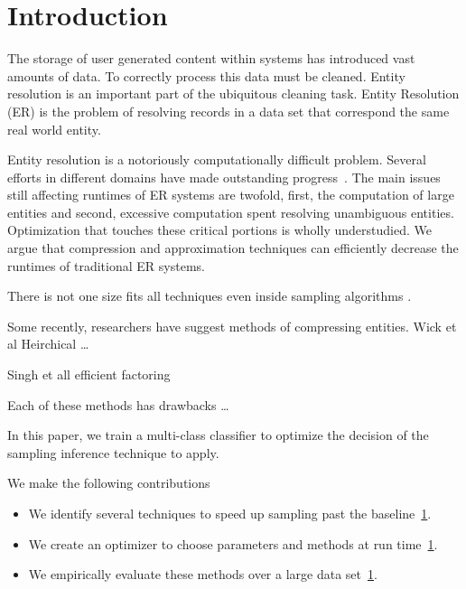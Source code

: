
\section{Introduction}

The storage of user generated content within systems has introduced 
vast amounts of data.
To correctly process this data must be cleaned. 
Entity resolution is an important part of the ubiquitous cleaning task.
Entity Resolution (ER) is the problem of resolving records in
a data set that correspond the same real world entity.

Entity resolution is a notoriously computationally difficult problem.
Several efforts in different domains have made outstanding progress~\cite{}.
The main issues still affecting runtimes of ER systems are
twofold, first, the computation of large entities and second, excessive
computation spent resolving unambiguous entities.
Optimization that touches these critical portions is wholly understudied.
We argue that compression and approximation 
techniques can efficiently decrease the runtimes of traditional ER systems.

There is not one size fits all techniques even inside sampling algorithms \cite{sculley2006compression}.

Some recently, researchers have suggest methods of compressing entities.
Wick et al Heirchical \ldots

Singh et all efficient factoring %

Each of these methods has drawbacks \ldots

In this paper, we train a multi-class classifier to optimize the decision of
the sampling inference technique to apply.


We make the following contributions

\begin{itemize}
\item We identify several techniques to speed up sampling past the baseline~\ref{}.
\item We create an optimizer to choose parameters and methods at run time~\ref{}.
\item We empirically evaluate these methods over a large data set~\ref{}.
\end{itemize}




